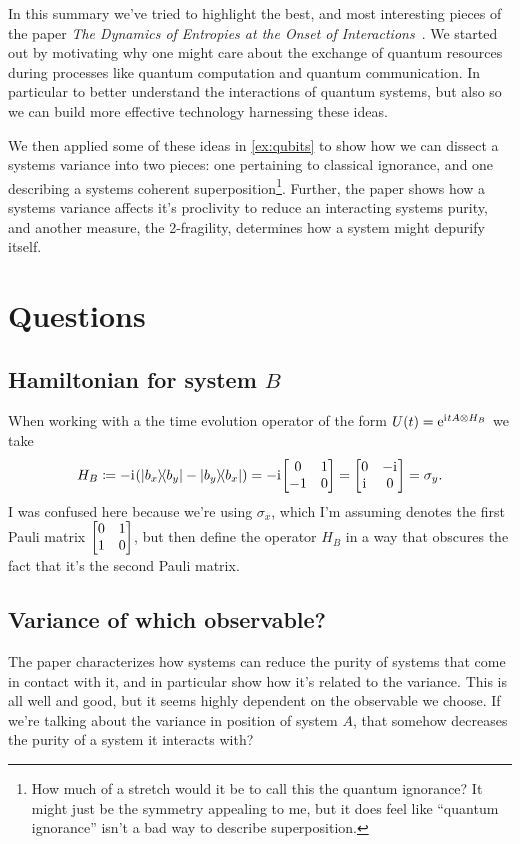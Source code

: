 \documentclass[11pt,english]{article}
\theoremstyle{definition}
\newcommand{\iu}{\mathrm{i}\mkern1mu}
\newcommand{\e}{\mathrm{e}}
\begin{document}
In this summary we've tried to highlight the best, and most interesting pieces of the paper \emph{The Dynamics of Entropies at the Onset of Interactions}~\cite{dynamic-entropies}. We started out by motivating why one might care about the exchange of quantum resources during processes like quantum computation and quantum communication. In particular to better understand the interactions of quantum systems, but also so we can build more effective technology harnessing these ideas.

We then applied some of these ideas in \cref{ex:qubits} to show how we can dissect a systems variance into two pieces: one pertaining to classical ignorance, and one describing a systems coherent superposition\footnote{How much of a stretch would it be to call this the quantum ignorance? It might just be the symmetry appealing to me, but it does feel like ``quantum ignorance'' isn't a bad way to describe superposition.}. Further, the paper shows how a systems variance affects it's proclivity to reduce an interacting systems purity, and another measure, the 2-fragility, determines how a system might depurify itself.

\section{Questions}

\subsection{Hamiltonian for system $B$}
When working with a the time evolution operator of the form $U(t) = \e^{\iu tA\otimes H_B}$ we take
\begin{equation*}
	H_B \coloneqq -\iu\qty(\ketbra{b_x}{b_y} - \ketbra{b_y}{b_x}) = -\iu\mqty[0 & 1 \\ -1 & 0] = \mqty[0 & -\iu \\ \iu & 0] = \sigma_y.
\end{equation*}
I was confused here because we're using $\sigma_x$, which I'm assuming denotes the first Pauli matrix $\mqty[0 & 1 \\ 1 & 0]$, but then define the operator $H_B$ in a way that obscures the fact that it's the second Pauli matrix.

\subsection{Variance of which observable?}
The paper characterizes how systems can reduce the purity of systems that come in contact with it, and in particular show how it's related to the variance. This is all well and good, but it seems highly dependent on the observable we choose. If we're talking about the variance in position of system $A$, that somehow decreases the purity of a system it interacts with?
\end{document}
